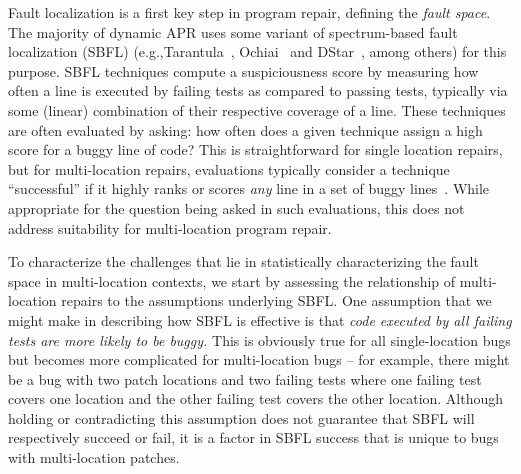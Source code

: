 \documentclass[10pt, conference]{IEEEtran}
\begin{document}
Fault localization is a first key step in program repair, defining the
\emph{fault space}. The majority of dynamic APR
uses some variant of spectrum-based fault localization (SBFL) (e.g.,Tarantula~\cite{tarantula},
Ochiai~\cite{ochiai} and DStar~\cite{wong2013dstar}, among others) for this purpose.
%
SBFL techniques compute a suspiciousness score by
measuring how often a line is executed by failing tests as compared to passing
tests, typically via some (linear) combination of their respective
coverage of a line. 
These techniques are often evaluated by asking: how often does a given technique assign a high 
score for a buggy line of code? This is straightforward for single location repairs, but for 
multi-location repairs, evaluations
typically consider a technique ``successful'' if it highly ranks or scores \emph{any} line in a
set of buggy lines~\cite{zou2019empirical,pearson2017evaluating,golagha2020can}.
While appropriate for the question being asked in such evaluations, this does not address
suitability for multi-location program repair.%

To characterize the challenges that lie in statistically characterizing the
fault space in multi-location contexts, we start by assessing the 
relationship of multi-location repairs to the assumptions underlying SBFL. 
One assumption that we might make in describing how SBFL is effective is that 
\emph{code executed by all failing tests are more likely to be buggy.}
This is obviously true for all single-location bugs but becomes more complicated for 
multi-location bugs -- for example, there might be a bug with two patch locations and two failing 
tests where one failing test covers one location and the other failing test covers the 
other location. Although holding or contradicting this assumption does not guarantee that SBFL 
will respectively succeed or fail, it is a factor in SBFL success that is unique to bugs with 
multi-location patches.
\end{document}
